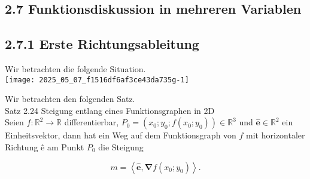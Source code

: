 \documentclass[10pt]{article}
\begin{document}
\subsection*{2.7 Funktionsdiskussion in mehreren Variablen}
\subsection*{2.7.1 Erste Richtungsableitung}
Wir betrachten die folgende Situation.\\
\texttt{[image: 2025\_05\_07\_f1516df6af3ce43da735g-1]}

Wir betrachten den folgenden Satz.\\
Satz 2.24 Steigung entlang eines Funktionsgraphen in 2D\\
Seien $f: \mathbb{R}^{2} \rightarrow \mathbb{R}$ differentierbar, $P_{0}=\left(x_{0} ; y_{0} ; f\left(x_{0} ; y_{0}\right)\right) \in \mathbb{R}^{3}$ und $\hat{\mathbf{e}} \in \mathbb{R}^{2}$ ein Einheitsvektor, dann hat ein Weg auf dem Funktionsgraph von $f$ mit horizontaler Richtung ê am Punkt $P_{0}$ die Steigung


\begin{equation*}
m=\left\langle\hat{\mathbf{e}}, \boldsymbol{\nabla} f\left(x_{0} ; y_{0}\right)\right\rangle . \tag{2.189}
\end{equation*}
\end{document}
